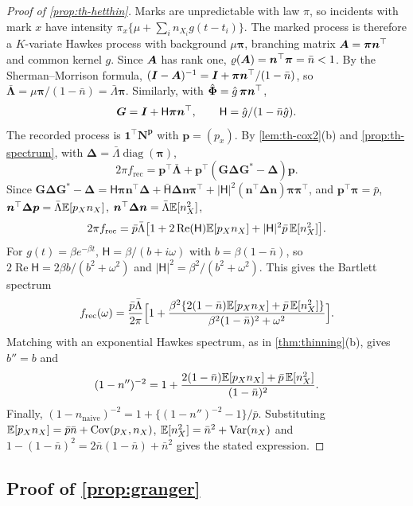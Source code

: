 \begin{proof}[Proof of \cref{prop:th-hetthin}]

Marks are unpredictable with law $\pi$, so incidents with mark $x$ have intensity
$\pi_x\{\mu+\sum_in_{X_i}g(t-t_i)\}$. The marked process is therefore a $K$-variate
Hawkes process with background $\mu\bm\pi$, branching matrix $\bm{A}=\bm\pi\bm n^{\top}$
and common kernel $g$. Since $\bm{A}$ has rank one, $\varrho(\bm{A})=\bm n^{\top}\bm\pi=\bar n<1$.
By the Sherman--Morrison formula,
$(\bm{I}-\bm{A})^{-1}=\bm{I}+\bm\pi\bm n^{\top}/(1-\bar n)$, so
$\bar{\bm\Lambda}=\mu\bm\pi/(1-\bar n)=\bar\Lambda\bm\pi$. Similarly, with
$\hat{\bm{\Phi}}=\hat g\,\bm\pi\bm n^{\top}$,
\[
\bm G=\bm{I}+\mathsf H\bm\pi\bm n^{\top},\qquad \mathsf H=\hat g/(1-\bar n\hat g).
\]
The recorded process is $\mathbf 1^{\top}\bm N^{\bm p}$ with $\bm p=(p_x)$.
By \cref{lem:th-cox2}(b) and \cref{prop:th-spectrum}, with
$\bm\Delta=\bar\Lambda\operatorname{diag}(\bm\pi)$,
\[
2\pi f_{\mathrm{rec}}=\bm p^{\top}\bar{\bm\Lambda}+\bm p^{\top}(\bm G\bm\Delta\bm G^*-\bm\Delta)\bm p .
\]
Since
$\bm G\bm\Delta\bm G^*-\bm\Delta=\mathsf H\bm\pi\bm n^{\top}\bm\Delta+\bar{\mathsf H}\bm\Delta\bm n\bm\pi^{\top}+|\mathsf H|^2(\bm n^{\top}\bm\Delta\bm n)\bm\pi\bm\pi^{\top}$,
and $\bm p^{\top}\bm\pi=\bar p$, $\bm n^{\top}\bm\Delta\bm p=\bar\Lambda\mathbb{E}[p_Xn_X]$,
$\bm n^{\top}\bm\Delta\bm n=\bar\Lambda\mathbb{E}[n_X^2]$,
\[
2\pi f_{\mathrm{rec}}=\bar p\bar\Lambda\big[1+2\operatorname{Re}(\mathsf H)\mathbb{E}[p_Xn_X]+|\mathsf H|^2\bar p\,\mathbb{E}[n_X^2]\big].
\]
For $g(t)=\beta e^{-\beta t}$, $\mathsf H=\beta/(b+i\omega)$ with $b=\beta(1-\bar n)$, so
$2\operatorname{Re}\mathsf H=2\beta b/(b^2+\omega^2)$ and
$|\mathsf H|^2=\beta^2/(b^2+\omega^2)$. This gives the Bartlett spectrum
\[
f_{\mathrm{rec}}(\omega)=\frac{\bar p\bar\Lambda}{2\pi}\Big[1+\frac{\beta^2\{2(1-\bar n)\mathbb{E}[p_Xn_X]+\bar p\,\mathbb{E}[n_X^2]\}}{\beta^2(1-\bar n)^2+\omega^2}\Big].
\]
Matching with
an exponential Hawkes spectrum, as in \cref{thm:thinning}(b), gives $b''=b$ and
\[
(1-n'')^{-2}=1+\frac{2(1-\bar n)\mathbb{E}[p_Xn_X]+\bar p\,\mathbb{E}[n_X^2]}{(1-\bar n)^2}.
\]
Finally, $(1-n_{\mathrm{naive}})^{-2}=1+\{(1-n'')^{-2}-1\}/\bar p$. Substituting
$\mathbb{E}[p_Xn_X]=\bar p\bar n+\operatorname{Cov}(p_X,n_X)$, $\mathbb{E}[n_X^2]=\bar n^2+\operatorname{Var}(n_X)$ and
$1-(1-\bar n)^2=2\bar n(1-\bar n)+\bar n^2$ gives the stated expression.
\end{proof}

\subsection{Proof of \texorpdfstring{\cref{prop:granger}}{Proposition (Granger)}}

